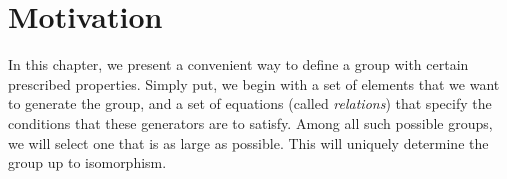 \section{Motivation}

\begin{remark}
	In this chapter, we present a convenient way to define a group with certain prescribed properties. Simply put, we begin with a set of elements that we want to generate the group, and a set of equations (called \textit{relations}) that specify the conditions that these generators are to satisfy. Among all such possible groups, we will select one that is as large as possible. This will uniquely determine the group up to isomorphism.
\end{remark}
